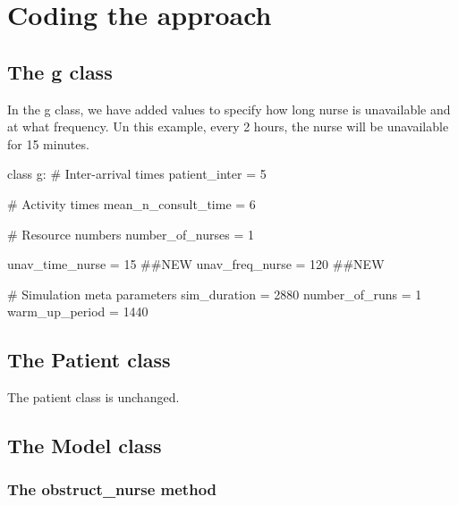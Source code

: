 \documentclass[
  letterpaper,
  DIV=11,
  numbers=noendperiod]{scrreprt}
\newenvironment{Shaded}{}{}
\newcommand{\CommentTok}[1]{\textcolor[rgb]{0.42,0.45,0.49}{#1}}
\newcommand{\DecValTok}[1]{\textcolor[rgb]{0.00,0.36,0.77}{#1}}
\newcommand{\KeywordTok}[1]{\textcolor[rgb]{0.84,0.23,0.29}{#1}}
\newcommand{\NormalTok}[1]{\textcolor[rgb]{0.14,0.16,0.18}{#1}}
\newcommand{\OperatorTok}[1]{\textcolor[rgb]{0.14,0.16,0.18}{#1}}
\begin{document}
\section{Coding the approach}\label{coding-the-approach}

\subsection{The g class}\label{the-g-class-3}

In the g class, we have added values to specify how long nurse is
unavailable and at what frequency. Un this example, every 2 hours, the
nurse will be unavailable for 15 minutes.

\begin{Shaded}
\begin{Highlighting}[]
\KeywordTok{class}\NormalTok{ g:}
    \CommentTok{\# Inter{-}arrival times}
\NormalTok{    patient\_inter }\OperatorTok{=} \DecValTok{5}

    \CommentTok{\# Activity times}
\NormalTok{    mean\_n\_consult\_time }\OperatorTok{=} \DecValTok{6}

    \CommentTok{\# Resource numbers}
\NormalTok{    number\_of\_nurses }\OperatorTok{=} \DecValTok{1}

\NormalTok{    unav\_time\_nurse }\OperatorTok{=} \DecValTok{15} \CommentTok{\#\#NEW}
\NormalTok{    unav\_freq\_nurse }\OperatorTok{=} \DecValTok{120} \CommentTok{\#\#NEW}

    \CommentTok{\# Simulation meta parameters}
\NormalTok{    sim\_duration }\OperatorTok{=} \DecValTok{2880}
\NormalTok{    number\_of\_runs }\OperatorTok{=} \DecValTok{1}
\NormalTok{    warm\_up\_period }\OperatorTok{=} \DecValTok{1440}
\end{Highlighting}
\end{Shaded}

\subsection{The Patient class}\label{the-patient-class-3}

The patient class is unchanged.

\subsection{The Model class}\label{the-model-class-3}

\subsubsection{The obstruct\_nurse
method}\label{the-obstruct_nurse-method}
\end{document}
